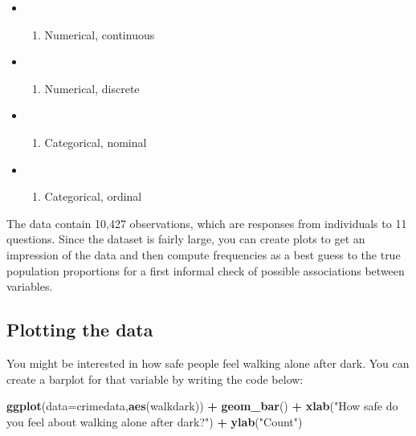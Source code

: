 \documentclass[
]{book}
\newenvironment{Shaded}{\begin{snugshade}}{\end{snugshade}}
\newcommand{\AttributeTok}[1]{\textcolor[rgb]{0.13,0.29,0.53}{#1}}
\newcommand{\FunctionTok}[1]{\textcolor[rgb]{0.13,0.29,0.53}{\textbf{#1}}}
\newcommand{\NormalTok}[1]{#1}
\newcommand{\SpecialCharTok}[1]{\textcolor[rgb]{0.81,0.36,0.00}{\textbf{#1}}}
\newcommand{\StringTok}[1]{\textcolor[rgb]{0.31,0.60,0.02}{#1}}
\providecommand{\tightlist}{%
  \setlength{\itemsep}{0pt}\setlength{\parskip}{0pt}}
\begin{document}
\begin{itemize}
\item
  \begin{enumerate}
  \def\labelenumi{(\Alph{enumi})}
  \tightlist
  \item
    Numerical, continuous\\
  \end{enumerate}
\item
  \begin{enumerate}
  \def\labelenumi{(\Alph{enumi})}
  \setcounter{enumi}{1}
  \tightlist
  \item
    Numerical, discrete\\
  \end{enumerate}
\item
  \begin{enumerate}
  \def\labelenumi{(\Alph{enumi})}
  \setcounter{enumi}{2}
  \tightlist
  \item
    Categorical, nominal\\
  \end{enumerate}
\item
  \begin{enumerate}
  \def\labelenumi{(\Alph{enumi})}
  \setcounter{enumi}{3}
  \tightlist
  \item
    Categorical, ordinal
  \end{enumerate}
\end{itemize}

The data contain 10,427 observations, which are responses from individuals to 11 questions. Since the dataset is fairly large, you can create plots to get an impression of the data and then compute frequencies as a best guess to the true population proportions for a first informal check of possible associations between variables.

\hypertarget{plotting-the-data}{%
\subsection{Plotting the data}\label{plotting-the-data}}

You might be interested in how safe people feel walking alone after dark. You can create a barplot for that variable by writing the code below:

\begin{Shaded}
\begin{Highlighting}[]
\FunctionTok{ggplot}\NormalTok{(}\AttributeTok{data=}\NormalTok{crimedata,}\FunctionTok{aes}\NormalTok{(walkdark)) }\SpecialCharTok{+} \FunctionTok{geom\_bar}\NormalTok{() }\SpecialCharTok{+} \FunctionTok{xlab}\NormalTok{(}\StringTok{"How safe do you feel about walking alone after dark?"}\NormalTok{) }\SpecialCharTok{+} \FunctionTok{ylab}\NormalTok{(}\StringTok{"Count"}\NormalTok{)}
\end{Highlighting}
\end{Shaded}
\end{document}
